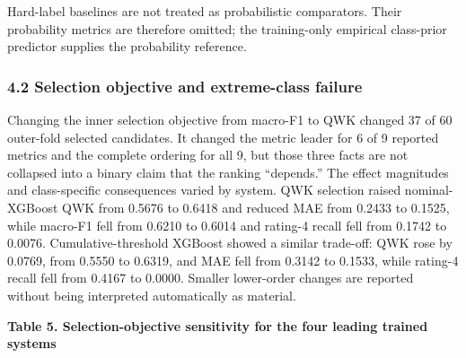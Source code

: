 \documentclass[
  a4paper,
  review]{elsarticle}
\begin{document}
Hard-label baselines are not treated as probabilistic comparators. Their
probability metrics are therefore omitted; the training-only empirical
class-prior predictor supplies the probability reference.

\subsubsection{4.2 Selection objective and extreme-class
failure}\label{selection-objective-and-extreme-class-failure}

Changing the inner selection objective from macro-F1 to QWK changed 37
of 60 outer-fold selected candidates. It changed the metric leader for 6
of 9 reported metrics and the complete ordering for all 9, but those
three facts are not collapsed into a binary claim that the ranking
``depends.'' The effect magnitudes and class-specific consequences
varied by system. QWK selection raised nominal-XGBoost QWK from 0.5676
to 0.6418 and reduced MAE from 0.2433 to 0.1525, while macro-F1 fell
from 0.6210 to 0.6014 and rating-4 recall fell from 0.1742 to 0.0076.
Cumulative-threshold XGBoost showed a similar trade-off: QWK rose by
0.0769, from 0.5550 to 0.6319, and MAE fell from 0.3142 to 0.1533, while
rating-4 recall fell from 0.4167 to 0.0000. Smaller lower-order changes
are reported without being interpreted automatically as material.

\textbf{Table 5. Selection-objective sensitivity for the four leading
trained systems}
\end{document}
